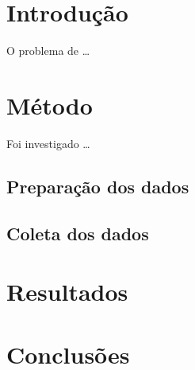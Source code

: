 \documentclass{article}
\begin{document}
\section{Introdução}
O problema de \ldots

\section{Método}
Foi investigado \ldots

\subsection{Preparação dos dados}
\subsection{Coleta dos dados}
\section{Resultados}
\section{Conclusões}
\end{document}
